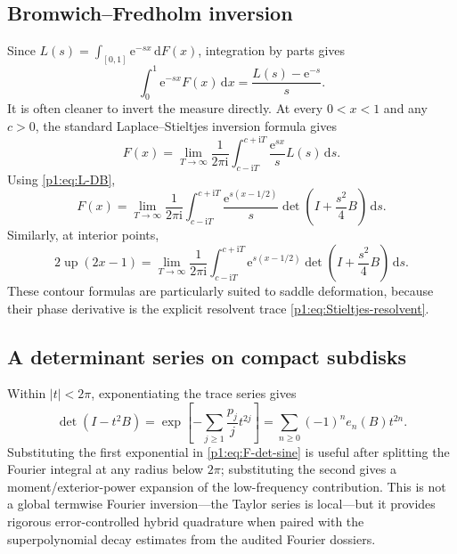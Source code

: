 \documentclass[11pt,oneside]{article}
\theoremstyle{definition}
\newcommand{\dd}{\,\mathrm d}
\newcommand{\e}{\mathrm e}
\newcommand{\ii}{\mathrm i}
\newcommand{\Up}{\operatorname{up}}
\begin{document}
\subsection{Bromwich--Fredholm inversion}

Since \(L(s)=\int_{[0,1]}\e^{-sx}\dd F(x)\), integration by parts gives
\begin{equation}
 \int_0^1\e^{-sx}F(x)\dd x=\frac{L(s)-\e^{-s}}s.
 \label{p1:eq:Laplace-CDF}
\end{equation}
It is often cleaner to invert the measure directly.  At every \(0<x<1\) and any
\(c>0\), the standard Laplace--Stieltjes inversion formula gives
\begin{equation}
 F(x)=\lim_{T\to\infty}\frac1{2\pi\ii}
 \int_{c-\ii T}^{c+\ii T}\frac{\e^{sx}}sL(s)\dd s.
 \label{p1:eq:Bromwich-F}
\end{equation}
Using \eqref{p1:eq:L-DB},
\begin{equation}
 \boxed{\quad
 F(x)=\lim_{T\to\infty}\frac1{2\pi\ii}
 \int_{c-\ii T}^{c+\ii T}
 \frac{\e^{s(x-1/2)}}s\det\!\left(I+\frac{s^2}{4}B\right)\dd s.
 \quad}
 \label{p1:eq:Bromwich-Fredholm-F}
\end{equation}
Similarly, at interior points,
\begin{equation}
 2\Up(2x-1)=\lim_{T\to\infty}\frac1{2\pi\ii}
 \int_{c-\ii T}^{c+\ii T}
 \e^{s(x-1/2)}\det\!\left(I+\frac{s^2}{4}B\right)\dd s.
 \label{p1:eq:Bromwich-up}
\end{equation}
These contour formulas are particularly suited to saddle deformation, because their
phase derivative is the explicit resolvent trace \eqref{p1:eq:Stieltjes-resolvent}.

\subsection{A determinant series on compact subdisks}

Within \(|t|<2\pi\), exponentiating the trace series gives
\begin{equation}
 \det(I-t^2B)=
 \exp\!\left[-\sum_{j\ge1}\frac{p_j}{j}t^{2j}\right]
 =\sum_{n\ge0}(-1)^ne_n(B)t^{2n}.
 \label{p1:eq:det-local-series}
\end{equation}
Substituting the first exponential in \eqref{p1:eq:F-det-sine} is useful after splitting
the Fourier integral at any radius below \(2\pi\); substituting the second gives a
moment/exterior-power expansion of the low-frequency contribution.  This is not a
global termwise Fourier inversion---the Taylor series is local---but it provides
rigorous error-controlled hybrid quadrature when paired with the superpolynomial
decay estimates from the audited Fourier dossiers.
\end{document}
